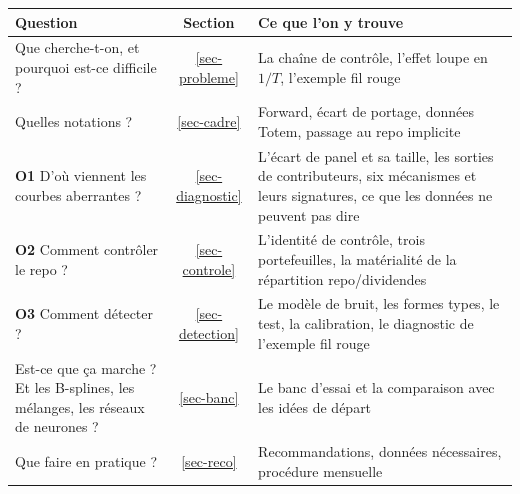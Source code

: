 \begin{center}\small
\begin{tabular}{>{\raggedright\arraybackslash}p{5.1cm}c>{\raggedright\arraybackslash}p{8.0cm}}
\toprule
Question & Section & Ce que l'on y trouve\\
\midrule
Que cherche-t-on, et pourquoi est-ce difficile ? & \ref{sec-probleme} & La chaîne de contrôle, l'effet loupe en $1/T$,
l'exemple fil rouge\\
Quelles notations ? & \ref{sec-cadre} & Forward, écart de portage, données Totem, passage au repo implicite\\
\textbf{O1} D'où viennent les courbes aberrantes ? & \ref{sec-diagnostic} & L'écart de panel et sa taille, les sorties
de contributeurs, six mécanismes et leurs signatures, ce que les données ne peuvent pas dire\\
\textbf{O2} Comment contrôler le repo ? & \ref{sec-controle} & L'identité de contrôle, trois portefeuilles,
la matérialité de la répartition repo/dividendes\\
\textbf{O3} Comment détecter ? & \ref{sec-detection} & Le modèle de bruit, les formes types, le test, la calibration,
le diagnostic de l'exemple fil rouge\\
Est-ce que ça marche ? Et les B-splines, les mélanges, les réseaux de neurones ? & \ref{sec-banc} & Le banc d'essai
et la comparaison avec les idées de départ\\
Que faire en pratique ? & \ref{sec-reco} & Recommandations, données nécessaires, procédure mensuelle\\
\bottomrule
\end{tabular}
\end{center}

{\small\setcounter{tocdepth}{2}\tableofcontents}
\newpage
